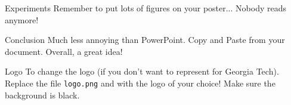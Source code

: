 \documentclass[serif,mathserif,final]{beamer}
\begin{document}
{\begin{frame}{}
\begin{columns}[t]
    \begin{column}{0.32\linewidth}

      \begin{block}{Experiments}
        Remember to put lots of figures on your poster... Nobody reads anymore!
      \end{block}

      \begin{block}{Conclusion}
        Much less annoying than PowerPoint.  Copy and Paste from your
        document. Overall, a great idea!
      \end{block}

      \begin{block}{Logo}
        To change the logo (if you don't want to represent for Georgia Tech).
        Replace the file {\tt logo.png} and with the logo of your choice!
        Make sure the background is black.
      \end{block}

    \end{column}%

  \end{columns}
\end{frame}
}
\end{document}
